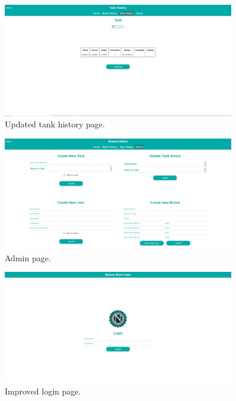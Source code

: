 \documentclass[draftclsnofoot,onecolumn,journal,letterpaper,compsoc,10pt]{IEEEtran}
\begin{document}
\begin{figure}[H]
    \centering
    \includegraphics[width=0.9\textwidth]{screenshots/progress_report_screencap-tank_history.png}
    \caption{Updated tank history page.}
\end{figure}

\begin{figure}[H]
    \centering
    \includegraphics[width=0.9\textwidth]{screenshots/progress_report_screencap-admin_page.png}
    \caption{Admin page.}
\end{figure}

\begin{figure}[H]
    \centering
    \includegraphics[width=0.9\textwidth]{screenshots/progress_report_screencap-login_page.png}
    \caption{Improved login page.}
\end{figure}
\end{document}
